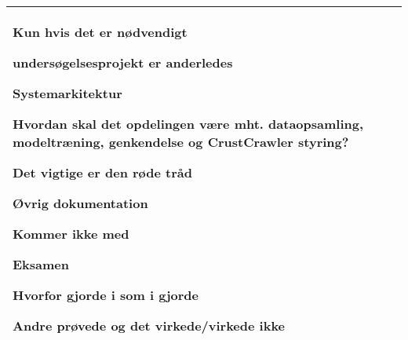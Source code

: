 \begin{center}
\begin{tabular}{| l | p{10cm} |}
\begin{myEnumerate}
\begin{myItemize}
				\item Kun hvis det er nødvendigt
				\item undersøgelsesprojekt er anderledes
			\end{myItemize}
			\item Systemarkitektur
			\begin{myItemize}
				\item Hvordan skal det opdelingen være mht. dataopsamling, modeltræning, genkendelse og CrustCrawler styring?
				\item Det vigtige er den røde tråd
			\end{myItemize}
			\item Øvrig dokumentation
			\begin{myItemize}
				\item Kommer ikke med
			\end{myItemize}
			\item Eksamen
			\begin{myItemize}
				\item Hvorfor gjorde i som i gjorde
				\begin{myItemize}
					\item Andre prøvede og det virkede/virkede ikke
				\end{myItemize}
			\end{myItemize}
		\end{myEnumerate}\\ 	
		\hline
	\end{tabular}
\end{center}

